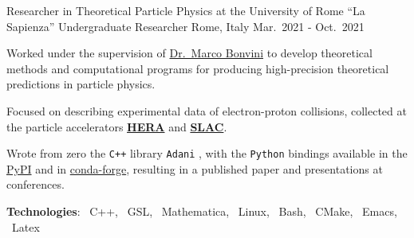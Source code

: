 \begin{cventries}
    \cventry
    {Researcher in Theoretical Particle Physics at the University of Rome ``La Sapienza''}
    {Undergraduate Researcher}
    {Rome, Italy}
    {Mar.\ 2021 - Oct.\ 2021}
    {
        \begin{cvitems} %
            \item Worked under the supervision of \href{https://inspirehep.net/authors/1058479?ui-citation-summary=true}{Dr.\ Marco Bonvini} to develop theoretical methods and computational programs for producing high-precision theoretical predictions in particle physics.
            \item Focused on describing experimental data of electron-proton collisions, collected at the particle accelerators \href{https://en.wikipedia.org/wiki/HERA_(particle_accelerator)}{\textbf{HERA}} and \href{https://en.wikipedia.org/wiki/SLAC_National_Accelerator_Laboratory}{\textbf{SLAC}}.
            \item Wrote from zero the \texttt{C++} library \texttt{Adani} \href{https://github.com/niclaurenti/adani}{\githublogo}, with the \texttt{Python} bindings available in the \href{https://pypi.org/project/adani/}{PyPI} and in \href{https://anaconda.org/conda-forge/adani}{conda-forge}, resulting in a published paper and presentations at conferences.
            \item[] \textbf{\textcolor{awesome-red}{Tec}hnologies}: \cpplogo{}~C++, \gnulogo{}~GSL, \mathematicalogo{}~Mathematica, \linuxlogo{}~Linux, \bashlogo{}~Bash, \cmakelogo{}~CMake, \emacslogo{}~Emacs, \latexlogo{}~Latex
        \end{cvitems}
    }

\end{cventries}